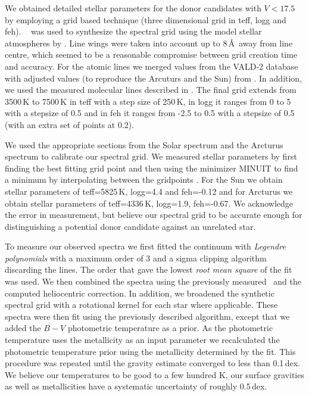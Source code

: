 We obtained detailed stellar parameters for the donor candidates with $V<17.5$ by employing a grid based technique (three dimensional grid in \gls{teff}, \gls{logg} and \gls{feh}). \moog\ \citep{1973ApJ...184..839S} was used to synthesize the spectral grid using the model stellar atmospheres by \citet{2003IAUS..210P.A20C}. Line wings were taken into account up to 8\,\AA\ away from line centre, which seemed to be a reasonable compromise between grid creation time and accuracy. For the atomic lines we merged values from the VALD-2 database \citep{2000BaltA...9..590K} with adjusted values (to reproduce the Arcuturs and the Sun) from \cite{2008A&A...486..951G}. In addition, we used the measured molecular lines described in  \citet{1995KurCD..23.....K}. The final grid extends from 3500\,K to 7500\,K in \gls{teff} with a step size of 250\,K, in \gls{logg} it ranges from  0 to 5 with a stepsize of 0.5 and in \gls{feh} it ranges from -2.5 to 0.5 with a stepsize of 0.5 (with an extra set of points at 0.2). 

We used the appropriate sections from the Solar spectrum \citep{1984sfat.book.....K} and the Arcturus spectrum \citep{2000vnia.book.....H} to calibrate our spectral grid. We measured stellar parameters by first finding the best fitting grid point and then using the minimizer MINUIT to find a minimum by interpolating between the gridpoints \citep[described in Chapter \ref{chap:ndinterp} of this thesis;][]{Barber96thequickhull}. For the Sun we obtain stellar parameters of \gls{teff}=5825\,K, \gls{logg}=4.4 and \gls{feh}=-0.12 and for Arcturus we obtain stellar parameters of \gls{teff}=4336\,K, \gls{logg}=1.9, \gls{feh}=-0.67. We acknowledge the error in measurement, but believe our spectral grid to be accurate enough for distinguishing a potential donor candidate against an unrelated star. 

To measure our observed spectra we first fitted the continuum with \textit{Legendre polynomials} with a maximum order of 3 and a sigma clipping algorithm discarding the lines. The order that gave the lowest \textit{root mean square} of the fit was used. We then combined the spectra using the previously measured \vrad\ and the computed heliocentric correction. In addition, we broadened the synthetic spectral grid with a rotational kernel for each star where applicable. These spectra were then fit using the previously described algorithm, except that we added the $B-V$ photometric temperature as a prior. As the photometric temperature uses the metallicity as an input parameter we recalculated the photometric temperature prior using the metallicity determined by the fit. This procedure was repeated until the gravity estimate converged to less than 0.1\,dex. We believe our temperatures to be good to a few hundred K, our surface gravities as well as metallicities have a systematic uncertainty of roughly 0.5\,dex. 

